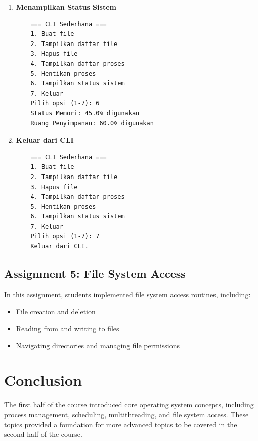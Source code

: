 \documentclass[12pt]{article}
\begin{document}
\begin{enumerate}
    \item \textbf{Menampilkan Status Sistem}
    \begin{verbatim}
    === CLI Sederhana ===
    1. Buat file
    2. Tampilkan daftar file
    3. Hapus file
    4. Tampilkan daftar proses
    5. Hentikan proses
    6. Tampilkan status sistem
    7. Keluar
    Pilih opsi (1-7): 6
    Status Memori: 45.0% digunakan
    Ruang Penyimpanan: 60.0% digunakan
    \end{verbatim}

    \item \textbf{Keluar dari CLI}
    \begin{verbatim}
    === CLI Sederhana ===
    1. Buat file
    2. Tampilkan daftar file
    3. Hapus file
    4. Tampilkan daftar proses
    5. Hentikan proses
    6. Tampilkan status sistem
    7. Keluar
    Pilih opsi (1-7): 7
    Keluar dari CLI.
    \end{verbatim}
\end{enumerate}

 
\subsection{Assignment 5: File System Access}
In this assignment, students implemented file system access routines, including:
\begin{itemize}
    \item File creation and deletion
    \item Reading from and writing to files
    \item Navigating directories and managing file permissions
\end{itemize}

\section{Conclusion}
The first half of the course introduced core operating system concepts, including process management, scheduling, multithreading, and file system access. These topics provided a foundation for more advanced topics to be covered in the second half of the course.

\end{document}
